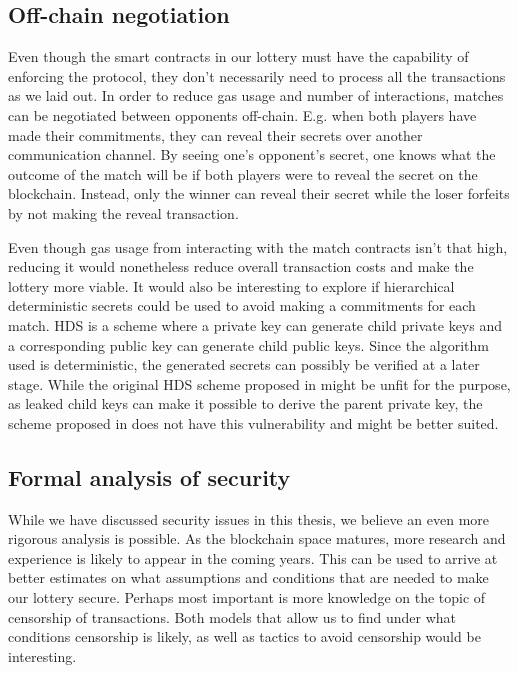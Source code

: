 \subsection{Off-chain negotiation}

Even though the smart contracts in our lottery must have the capability of enforcing the protocol, they don't necessarily need to process all the transactions as we laid out. In order to reduce gas usage and number of interactions, matches can be negotiated between opponents off-chain. E.g. when both players have made their commitments, they can reveal their secrets over another communication channel. By seeing one's opponent's secret, one knows what the outcome of the match will be if both players were to reveal the secret on the blockchain. Instead, only the winner can reveal their secret while the loser forfeits by not making the reveal transaction.

Even though gas usage from interacting with the match contracts isn't that high, reducing it would nonetheless reduce overall transaction costs and make the lottery more viable. It would also be interesting to explore if hierarchical deterministic secrets could be used to avoid making a commitments for each match. HDS is a scheme where a private key can generate child private keys and a corresponding public key can generate child public keys. Since the algorithm used is deterministic, the generated secrets can possibly be verified at a later stage. While the original HDS scheme proposed in \cite{wuille_bitcoin_2012} might be unfit for the purpose, as leaked child keys can make it possible to derive the parent private key, the scheme proposed in \cite{gutoski_hierarchical_2015} does not have this vulnerability and might be better suited.

\subsection{Formal analysis of security}

While we have discussed security issues in this thesis, we believe an even more rigorous analysis is possible. As the blockchain space matures, more research and experience is likely to appear in the coming years. This can be used to arrive at better estimates on what assumptions and conditions that are needed to make our lottery secure. Perhaps most important is more knowledge on the topic of censorship of transactions. Both models that allow us to find under what conditions censorship is likely, as well as tactics to avoid censorship would be interesting.
